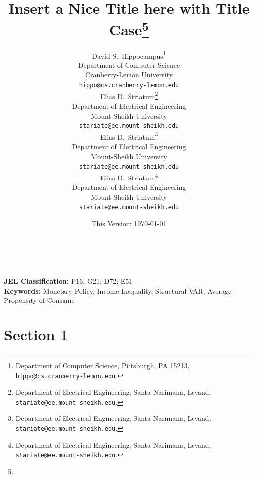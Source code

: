 \documentclass[11pt]{article}
\date{This Version: \today}
\title{Insert a Nice Title here with Title Case\thanks{\Acknowledgments}}
\author{
    {David S.~Hippocampus}\thanks{Department of Computer Science, Pittsburgh, PA 15213, \texttt{hippo@cs.cranberry-lemon.edu}.} \\
    Department of Computer Science\\
    Cranberry-Lemon University\\
    \texttt{hippo@cs.cranberry-lemon.edu} \\
    \And
    {Elias D.~Striatum}\thanks{Department of Electrical Engineering, Santa Narimana, Levand, \texttt{stariate@ee.mount-sheikh.edu}.} \\
    Department of Electrical Engineering\\
    Mount-Sheikh University\\
    \texttt{stariate@ee.mount-sheikh.edu} \\
    \AND
    {Elias D.~Striatum}\thanks{Department of Electrical Engineering, Santa Narimana, Levand, \texttt{stariate@ee.mount-sheikh.edu}.} \\
    Department of Electrical Engineering\\
    Mount-Sheikh University\\
    \texttt{stariate@ee.mount-sheikh.edu} \\
    \And
    {Elias D.~Striatum}\thanks{Department of Electrical Engineering, Santa Narimana, Levand, \texttt{stariate@ee.mount-sheikh.edu}.} \\
    Department of Electrical Engineering\\
    Mount-Sheikh University\\
    \texttt{stariate@ee.mount-sheikh.edu} \\
}
\begin{document}
\maketitle

\renewcommand{\thefootnote}{\arabic{footnote}}
\setcounter{footnote}{0}


\draftdisclaimer


\begin{abstract}
  \noindent \blindtext\\
\end{abstract}

\vfill

{\noindent \textbf{JEL Classification:} P16; G21; D72; E51} \\
{\noindent \textbf{Keywords:} Monetary Policy, Income Inequality, Structural VAR, Average Propensity of Consume}\\

\newpage





\section{Section 1}
\end{document}
